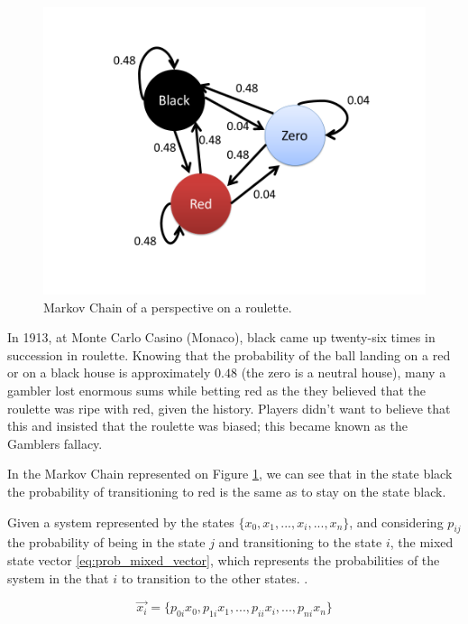 \begin{figure}[h]
\centering 
\includegraphics[scale=0.30]{Figures/RouletteMC.png}
\caption{Markov Chain of a perspective on a roulette.}
\label{fig:roulette}
\end{figure}

In 1913, at Monte Carlo Casino (Monaco), black came up twenty-six times in succession in roulette. Knowing that the probability of the ball landing on a red or on a black house is approximately $0.48$ (the zero is a neutral house), many a gambler lost enormous sums while betting red as the they believed that the roulette was ripe with red, given the history. Players didn't want to believe that this and insisted that the roulette was biased; this became known as the Gamblers fallacy.


In the Markov Chain represented on Figure \ref{fig:roulette}, we can see that in the state black the probability of transitioning to red is the same as to stay on the state black.

Given a system represented by the states $\{ x_{0}, x_{1}, ..., x_{i}, ..., x_{n}\}$, and considering $ p_{ij}$ the probability of being in the state $j$ and transitioning to the state $i$, the mixed state vector \ref{eq:prob_mixed_vector}, which represents the probabilities of the system in the that $i$ to transition to the other states. .

\begin{equation}
\label{eq:prob_mixed_vector}
\overrightarrow{x_{i}}  = \{ p_{0i}x_{0} , p_{1i}x_{1}, ... ,  p_{ii}x_{i}, ..., p_{ni}x_{n} \}
\end{equation}


